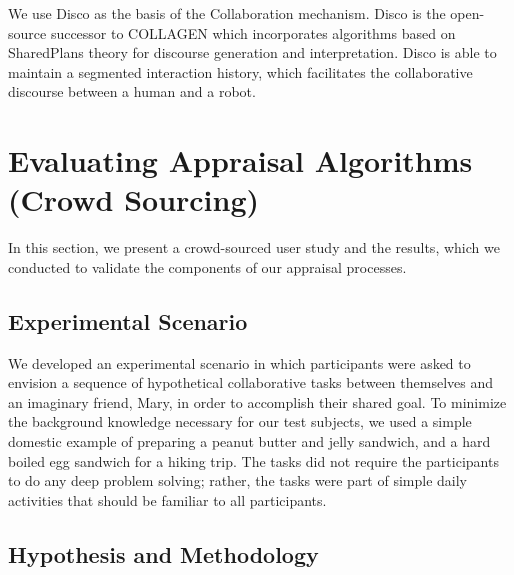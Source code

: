 \documentclass[12pt]{report}
\begin{document}
We use Disco as the basis of the Collaboration mechanism. Disco is the
open-source successor to COLLAGEN
\cite{rich:collaboration-manager,rich:discourse} which incorporates algorithms
based on SharedPlans theory for discourse generation and interpretation. Disco
is able to maintain a segmented interaction history, which facilitates the
collaborative discourse between a human and a robot.

\section{Evaluating Appraisal Algorithms (Crowd Sourcing)}
\label{sec:crowd-sourcing}
In this section, we present a crowd-sourced user study and the results, which
we conducted to validate the components of our appraisal processes.

\subsection{Experimental Scenario}
We developed an experimental scenario in which participants were asked to
envision a sequence of hypothetical collaborative tasks between themselves and
an imaginary friend, Mary, in order to accomplish their shared goal. To minimize
the background knowledge necessary for our test subjects, we used a simple
domestic example of preparing a peanut butter and jelly sandwich, and a hard
boiled egg sandwich for a hiking trip. The tasks did not require the
participants to do any deep problem solving; rather, the tasks were part of
simple daily activities that should be familiar to all participants. 
% 
% 

\subsection{Hypothesis and Methodology}
\end{document}

